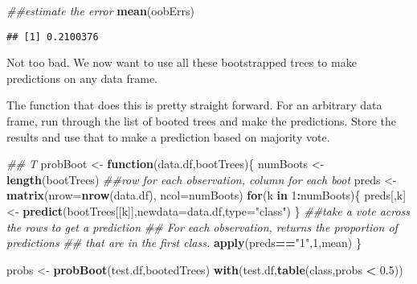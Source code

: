 \documentclass[]{article}
\newenvironment{Shaded}{\begin{snugshade}}{\end{snugshade}}
\newcommand{\CommentTok}[1]{\textcolor[rgb]{0.56,0.35,0.01}{\textit{#1}}}
\newcommand{\ControlFlowTok}[1]{\textcolor[rgb]{0.13,0.29,0.53}{\textbf{#1}}}
\newcommand{\DataTypeTok}[1]{\textcolor[rgb]{0.13,0.29,0.53}{#1}}
\newcommand{\DecValTok}[1]{\textcolor[rgb]{0.00,0.00,0.81}{#1}}
\newcommand{\FloatTok}[1]{\textcolor[rgb]{0.00,0.00,0.81}{#1}}
\newcommand{\KeywordTok}[1]{\textcolor[rgb]{0.13,0.29,0.53}{\textbf{#1}}}
\newcommand{\NormalTok}[1]{#1}
\newcommand{\OperatorTok}[1]{\textcolor[rgb]{0.81,0.36,0.00}{\textbf{#1}}}
\newcommand{\StringTok}[1]{\textcolor[rgb]{0.31,0.60,0.02}{#1}}
\begin{document}
\begin{Shaded}
\begin{Highlighting}[]
\CommentTok{##estimate the error}
\KeywordTok{mean}\NormalTok{(oobErrs)}
\end{Highlighting}
\end{Shaded}

\begin{verbatim}
## [1] 0.2100376
\end{verbatim}

Not too bad. We now want to use all these bootstrapped trees to make
predictions on any data frame.

The function that does this is pretty straight forward. For an arbitrary
data frame, run through the list of booted trees and make the
predictions. Store the results and use that to make a prediction based
on majority vote.

\begin{Shaded}
\begin{Highlighting}[]
\CommentTok{## T}
\NormalTok{probBoot <-}\StringTok{ }\ControlFlowTok{function}\NormalTok{(data.df,bootTrees)\{}
\NormalTok{  numBoots <-}\StringTok{ }\KeywordTok{length}\NormalTok{(bootTrees)}
  \CommentTok{##row for each observation, column for each boot}
\NormalTok{  preds <-}\StringTok{ }\KeywordTok{matrix}\NormalTok{(}\DataTypeTok{nrow=}\KeywordTok{nrow}\NormalTok{(data.df),}
                  \DataTypeTok{ncol=}\NormalTok{numBoots)}
  \ControlFlowTok{for}\NormalTok{(k }\ControlFlowTok{in} \DecValTok{1}\OperatorTok{:}\NormalTok{numBoots)\{}
\NormalTok{    preds[,k]  <-}\StringTok{ }\KeywordTok{predict}\NormalTok{(bootTrees[[k]],}\DataTypeTok{newdata=}\NormalTok{data.df,}\DataTypeTok{type=}\StringTok{"class"}\NormalTok{)}
\NormalTok{  \}}
  \CommentTok{##take a vote across the rows to get a prediction}
  \CommentTok{## For each observation, returns the proportion of predictions}
  \CommentTok{## that are in the  first class.}
  \KeywordTok{apply}\NormalTok{(preds}\OperatorTok{==}\StringTok{"1"}\NormalTok{,}\DecValTok{1}\NormalTok{,mean)}
\NormalTok{\}}
\end{Highlighting}
\end{Shaded}

\begin{Shaded}
\begin{Highlighting}[]
\NormalTok{probs <-}\StringTok{ }\KeywordTok{probBoot}\NormalTok{(test.df,bootedTrees)}
\KeywordTok{with}\NormalTok{(test.df,}\KeywordTok{table}\NormalTok{(class,probs }\OperatorTok{<}\StringTok{ }\FloatTok{0.5}\NormalTok{))}
\end{Highlighting}
\end{Shaded}
\end{document}
